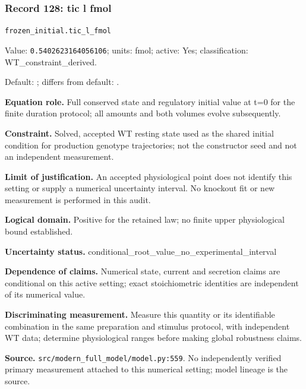 \subsubsection*{Record 128: tic l fmol}
{\small \nolinkurl{frozen_initial.tic_l_fmol}\par

Value: \texttt{0.5402623164056106}; units: fmol; active: Yes; classification: WT\_constraint\_derived.\par

Default: ; differs from default: .\par

\textbf{Equation role.} Full conserved state and regulatory initial value at t=0 for the finite duration protocol; all amounts and both volumes evolve subsequently.\par

\textbf{Constraint.} Solved, accepted WT resting state used as the shared initial condition for production genotype trajectories; not the constructor seed and not an independent measurement.\par

\textbf{Limit of justification.} An accepted physiological point does not identify this setting or supply a numerical uncertainty interval. No knockout fit or new measurement is performed in this audit.\par

\textbf{Logical domain.} Positive for the retained law; no finite upper physiological bound established.\par

\textbf{Uncertainty status.} conditional\_root\_value\_no\_experimental\_interval\par

\textbf{Dependence of claims.} Numerical state, current and secretion claims are conditional on this active setting; exact stoichiometric identities are independent of its numerical value.\par

\textbf{Discriminating measurement.} Measure this quantity or its identifiable combination in the same preparation and stimulus protocol, with independent WT data; determine physiological ranges before making global robustness claims.\par

\textbf{Source.} \nolinkurl{src/modern_full_model/model.py:559}. No independently verified primary measurement attached to this numerical setting; model lineage is the source.\par}

